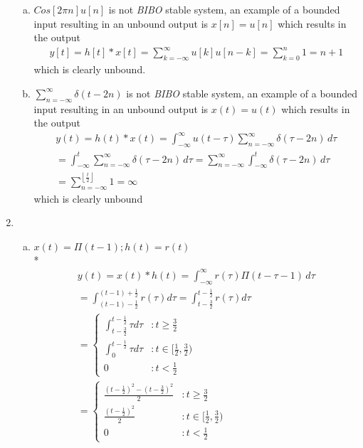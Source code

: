 \documentclass[10pt, letterpaper]{article}
\begin{document}
\begin{enumerate}[1)]
\begin{enumerate}[a.]
    \item $Cos[2\pi n] u[n]$ is not \emph{BIBO} stable system, an example of a bounded input 
        resulting in an unbound output is $x[n]= u[n]$ which results in the output
        \begin{align*}
        y[t] = h[t] * x[t] = 
        \sum_{k = -\infty}^{\infty} u[k] u[n - k] 
        = \sum_{k = 0}^{n} 1 
        = \boxed{n +1 }
        \end{align*}
        which is clearly unbound.
    
    \item $\sum_{n = -\infty}^{\infty}\delta(t - 2n)$ is not \emph{BIBO} stable system, an example of a bounded input 
        resulting in an unbound output is $x(t)= u(t)$ which results in the output
        \begin{align*}
        	y(t) = h(t) * x(t) = 
        	\int_{-\infty}^{\infty} u(t - \tau)\sum_{n = -\infty}^{\infty} \delta(\tau - 2n) \, d\tau \\
        	= \int_{-\infty}^{t} \sum_{n = -\infty}^{\infty} \delta(\tau - 2n) \, d\tau = 
        	\sum_{n = -\infty}^{\infty}  \int_{-\infty}^{t} \delta(\tau - 2n) \, d\tau \\
        	= \sum_{n = -\infty}^{\left \lfloor{\frac{t}{2}}\right \rfloor } 1 
        	= \boxed{\infty}
        \end{align*}
        which is clearly unbound
    \end{enumerate}


\item

\begin{enumerate}[a.]
\item
$x(t) = \Pi ( t - 1); h(t) = r(t)$ \\*
\begin{align*}
	y(t) = x(t) * h(t) = \int_{-\infty}^{\infty} r(\tau) \Pi (t - \tau - 1) \, d\tau \\
	= \int_{(t - 1) - \frac{1}{2}}^{(t - 1) + \frac{1}{2}}r(\tau) d\tau
	= \int_{t - \frac{3}{2}}^{t - \frac{1}{2}}r(\tau) d\tau \\
           = \left\{
  		\begin{array}{lr}
		    \int_{t - \frac{3}{2}}^{t - \frac{1}{2}}\tau d\tau & : t\geq \frac{3}{2} \\
		    \int_{0}^{t - \frac{1}{2}}\tau d\tau & : t \in [\frac{1}{2}, \frac{3}{2})\\
	              0 & : t < \frac{1}{2}
		  \end{array}
	\right. \\
	=
	\boxed{
          	\left\{
  		\begin{array}{lr}
		    \frac{(t - \frac{1}{2})^2 - (t - \frac{3}{2})^2}{2} & : t \geq \frac{3}{2} \\
		    \frac{(t - \frac{1}{2})^2}{2} & : t \in [\frac{1}{2}, \frac{3}{2})\\
	              0 & : t < \frac{1}{2}
		  \end{array}
	\right.
	}
\end{align*}


\end{enumerate}
\end{enumerate}
\end{document}
